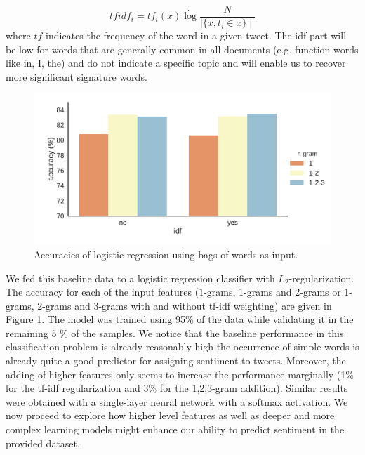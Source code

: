 \documentclass[10pt,conference,compsocconf,retainorgcmds]{IEEEtran}
\begin{document}
$$ tfidf_i =tf_i(x)\dot \log{\frac{N}{\mid \{x, t_i \in x \} \mid}} $$
where $tf$ indicates the frequency of the word in a given tweet. The idf part will be low for words that are generally common in all documents (e.g. function words like in, I, the) and do not indicate a specific topic and will enable us to recover more significant signature words. \\
\begin{figure}[h]
    \centering
    \includegraphics[width=\linewidth]{imag/idf.pdf}
    \caption{Accuracies of logistic regression using bags of words as input.}
    \label{fig:my_label}
\end{figure}

We fed this baseline data to a logistic regression classifier with  $L_2$-regularization. The accuracy for each of the input features (1-grams, 1-grams and 2-grams or 1-grams, 2-grams and 3-grams with and without tf-idf weighting) are given in Figure \ref{fig:my_label}. The model was trained using 95\% of the data while validating it in the remaining 5 \% of the samples. We  notice that the baseline performance in this classification problem is already reasonably high the occurrence of simple words is already quite a good predictor for assigning sentiment to tweets. Moreover, the adding of higher features only seems to increase the performance marginally (1\% for the tf-idf regularization and 3\% for the 1,2,3-gram addition). Similar results were obtained with a single-layer neural network with a softmax activation. We now proceed  to explore how higher level features as well as deeper and more complex learning models might enhance our ability to predict sentiment in the provided dataset.
\end{document}
